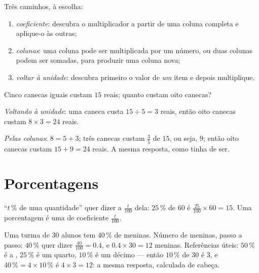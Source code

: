 \begin{method}\label{met:g6:propdata:complete}
Três caminhos, à escolha:
\begin{enumerate}
  \item \emph{coeficiente}: descubra o multiplicador a partir de uma
        coluna completa e aplique-o às outras;
  \item \emph{colunas}: uma coluna pode ser multiplicada por um número,
        ou duas colunas podem ser somadas, para produzir uma coluna
        nova;
  \item \emph{voltar à unidade}: descubra primeiro o valor de
        \emph{um} item e depois multiplique.
\end{enumerate}
\end{method}

\begin{example}\label{ex:g6:propdata:methods}
Cinco canecas iguais custam $15$ reais; quanto custam oito canecas?

\emph{Voltando à unidade}: uma caneca custa $15 \div 5 = 3$ reais,
então oito canecas custam $8 \times 3 = 24$ reais.

\emph{Pelas colunas}: $8 = 5 + 3$; três canecas custam $\frac{3}{5}$ de
$15$, ou seja, $9$; então oito canecas custam $15 + 9 = 24$ reais. A
mesma resposta, como tinha de ser.
\end{example}

\section{Porcentagens}

\begin{definition}[Porcentagem]\label{def:g6:propdata:percent}
``$t\,\%$ de uma quantidade'' quer dizer a  $\frac{t}{100}$ dela:
$25\,\%$ de $60$ é $\frac{25}{100} \times 60 = 15$. Uma porcentagem é
uma  de coeficiente $\frac{t}{100}$.
\end{definition}

\begin{example}\label{ex:g6:propdata:percent}
Uma turma de $30$ alunos tem $40\,\%$ de meninas. Número de meninas,
passo a passo: $40\,\%$ quer dizer $\frac{40}{100} = 0.4$, e
$0.4 \times 30 = 12$ meninas. Referências úteis: $50\,\%$ é a ,
$25\,\%$ é um quarto, $10\,\%$ é um décimo --- então $10\,\%$ de $30$ é
$3$, e $40\,\% = 4 \times 10\,\%$ é $4 \times 3 = 12$: a mesma
resposta, calculada de cabeça.
\end{example}

